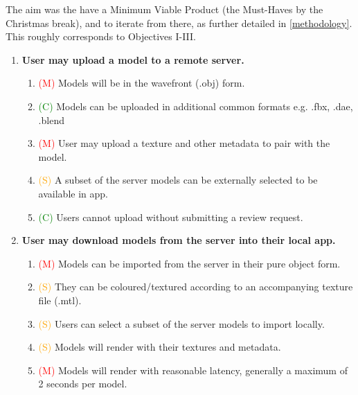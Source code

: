 \documentclass{article}
\newcommand{\must}[1]{\textcolor{red}{#1}}
\newcommand{\should}[1]{\textcolor{orange}{#1}}
\newcommand{\could}[1]{\textcolor{green}{#1}}
\begin{document}
The aim was the have a Minimum Viable Product (the Must-Haves by the Christmas break), and to iterate from there, as further detailed in \ref{methodology}. This roughly corresponds to Objectives I-III.

\begin{enumerate}[label=\Roman*.]
\item \textbf{User may upload a model to a remote server.}
    \begin{enumerate}[label=\arabic*.]
    \item \must{(M)} Models will be in the wavefront (.obj) form.
    \item \could{(C)} Models can be uploaded in additional common formats e.g. .fbx, .dae, .blend
    \item \must{(M)} User may upload a texture and other metadata to pair with the model.
    \item \should{(S)} A subset of the server models can be externally selected to be available in app.
    \item \could{(C)} Users cannot upload without submitting a review request.
    \end{enumerate}
    
\item \textbf{User may download models from the server into their local app.}
    \begin{enumerate}[label=\arabic*.]
    \item \must{(M)} Models can be imported from the server in their pure object form.
    \item \should{(S)} They can be coloured/textured according to an accompanying texture file (.mtl).
    \item \should{(S)} Users can select a subset of the server models to import locally.
    \item \should{(S)} Models will render with their textures and metadata.
    \item \must{(M)} Models will render with reasonable latency, generally a maximum of 2 seconds per model.
    \end{enumerate}


\end{enumerate}
\end{document}
